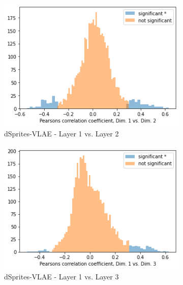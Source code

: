 \begin{figure}
    \centering
    \begin{subfigure}{.3\textwidth}
        \includegraphics[width=\textwidth]{images/notprop/dsprites/vlae/dim_1_2.png}
        \caption{dSprites-VLAE - Layer 1 vs. Layer 2}
    \end{subfigure}
    \hfill
    \begin{subfigure}{.3\textwidth}
        \includegraphics[width=\textwidth]{images/notprop/dsprites/vlae/dim_1_3.png}
        \caption{dSprites-VLAE - Layer 1 vs. Layer 3}
    \end{subfigure}
    \hfill
    \begin{subfigure}{.3\textwidth}

\end{subfigure}
\end{figure}
